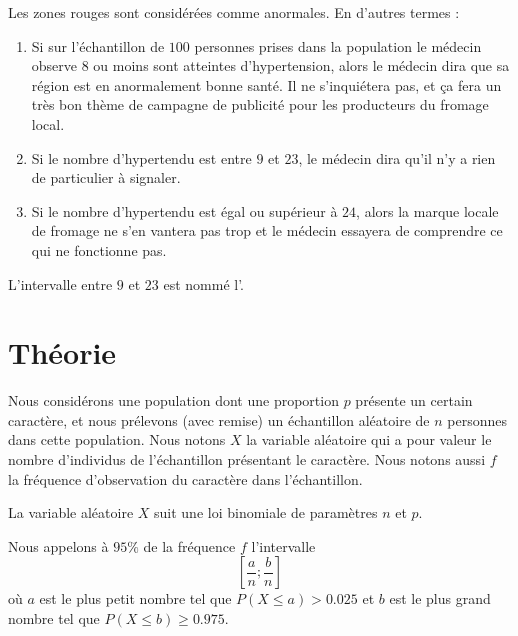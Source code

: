 \begin{center}

\end{center}
Les zones rouges sont considérées comme anormales. En d'autres termes :
\begin{enumerate}
    \item
        Si sur l'échantillon de \( 100\) personnes prises dans la population le médecin observe \( 8\) ou moins sont atteintes d'hypertension, alors le médecin dira que sa région est en anormalement bonne santé. Il ne s'inquiétera pas, et ça fera un très bon thème de campagne de publicité pour les producteurs du fromage local.
    \item
        Si le nombre d'hypertendu est entre \( 9\) et \( 23\), le médecin dira qu'il n'y a rien de particulier à signaler.
    \item
        Si le nombre d'hypertendu est égal ou supérieur à \( 24\), alors la marque locale de fromage ne s'en vantera pas trop et le médecin essayera de comprendre ce qui ne fonctionne pas.
\end{enumerate}
L'intervalle entre \( 9\) et \( 23\) est nommé l'.

\section{Théorie}

Nous considérons une population dont une proportion \( p\)  présente un certain caractère, et nous prélevons (avec remise) un échantillon aléatoire de \( n\) personnes dans cette population. Nous notons \( X\) la variable aléatoire qui a pour valeur le nombre d'individus de l'échantillon présentant le caractère. Nous notons aussi \( f\) la fréquence d'observation du caractère dans l'échantillon.

La variable aléatoire \( X\) suit une loi binomiale de paramètres \( n\) et \( p\). 

Nous appelons  à \( 95\%\) de la fréquence \( f\) l'intervalle 
\begin{equation}
    \left[ \frac{ a }{ n };\frac{ b }{ n } \right]
\end{equation}
où \(  a\) est le plus petit nombre tel que \( P(X\leq a)>0.025\) et \( b\) est le plus grand nombre tel que \( P(X\leq b)\geq 0.975\).

